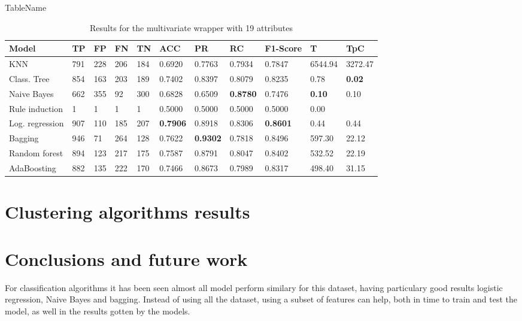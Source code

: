 \documentclass[a4paper,11pt]{article}
\begin{document}
\begin{table}
\centering
\caption{TableName}
\begin{tabular}{|l|l|l|l|l|l|l|l|l|l|l|}
\hline

\textbf{Model} & \textbf{TP} & \textbf{FP} & \textbf{FN} & \textbf{TN} & \textbf{ACC} & \textbf{PR} & \textbf{RC} & \textbf{F1-Score} & \textbf{T} & \textbf{TpC} \\ \hline
KNN & 791 & 228 & 206 & 184 & 0.6920 & 0.7763 & 0.7934 & 0.7847 & 6544.94 & 3272.47 \\ \hline
Class. Tree & 854 & 163 & 203 & 189 & 0.7402 & 0.8397 & 0.8079 & 0.8235 & 0.78 & \textbf{0.02} \\ \hline
Naive Bayes & 662 & 355 & 92 & 300 & 0.6828 & 0.6509 & \textbf{0.8780} & 0.7476 & \textbf{0.10} & 0.10 \\ \hline
Rule induction & 1 & 1 & 1 & 1 & 0.5000 & 0.5000 & 0.5000 & 0.5000 & 0.00 \\ \hline
Log. regression & 907 & 110 & 185 & 207 & \textbf{0.7906} & 0.8918 & 0.8306 & \textbf{0.8601} & 0.44 & 0.44 \\ \hline
Bagging & 946 & 71 & 264 & 128 & 0.7622 & \textbf{0.9302} & 0.7818 & 0.8496 & 597.30 & 22.12 \\ \hline
Random forest & 894 & 123 & 217 & 175 & 0.7587 & 0.8791 & 0.8047 & 0.8402 & 532.52 & 22.19 \\ \hline
AdaBoosting & 882 & 135 & 222 & 170 & 0.7466 & 0.8673 & 0.7989 & 0.8317 & 498.40 & 31.15 \\ \hline

\end{tabular}
\caption{Results for the multivariate wrapper with 19 attributes}
\label{class:w75m}
\end{table}

\section{Clustering algorithms results}

\section{Conclusions and future work}

For classification algorithms it has been seen almost all model perform similary for this dataset, having particulary good results logistic regression, Naive Bayes and bagging. Instead of using all the dataset, using a subset of features can help, both in time to train and test the model, as well in the results gotten by the models.
\end{document}
